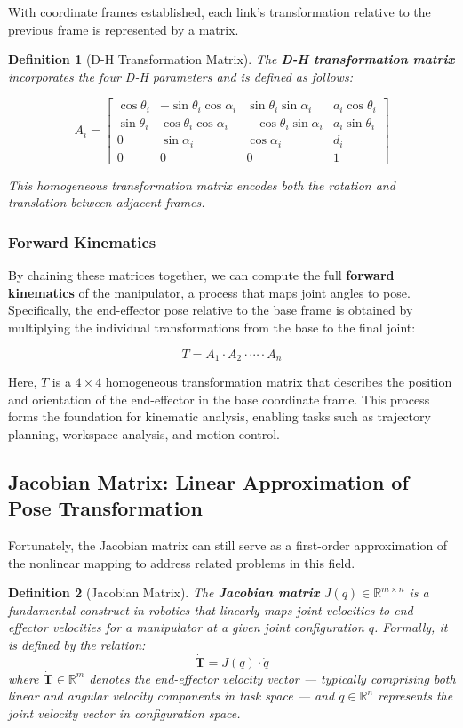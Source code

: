 \documentclass[conference]{IEEEtran}
\newtheorem{definition}{Definition}
\begin{document}
With coordinate frames established, each link’s transformation relative to the previous frame is represented by a matrix.

\begin{definition}[D-H Transformation Matrix]
	The \textbf{D-H transformation matrix} incorporates the four D-H parameters and is defined as follows:
	
	\[
	A_i=
	\begin{bmatrix}
		\cos\theta_i & -\sin\theta_i \cos\alpha_i & \sin\theta_i \sin\alpha_i & a_i \cos\theta_i \\
		\sin\theta_i & \cos\theta_i \cos\alpha_i & -\cos\theta_i \sin\alpha_i & a_i \sin\theta_i \\
		0 & \sin\alpha_i & \cos\alpha_i & d_i \\
		0 & 0 & 0 & 1
	\end{bmatrix}
	\]
	
	This homogeneous transformation matrix encodes both the rotation and translation between adjacent frames.
\end{definition}

\subsubsection{Forward Kinematics}
By chaining these matrices together, we can compute the full \textbf{forward kinematics} of the manipulator, a process that maps joint angles to pose. Specifically, the end-effector pose relative to the base frame is obtained by multiplying the individual transformations from the base to the final joint:

\[
T = A_1 \cdot A_2 \cdot \cdots \cdot A_n
\]

Here, \( T \) is a \( 4 \times 4 \) homogeneous transformation matrix that describes the position and orientation of the end-effector in the base coordinate frame. This process forms the foundation for kinematic analysis, enabling tasks such as trajectory planning, workspace analysis, and motion control.

\subsection{Jacobian Matrix: Linear Approximation of Pose Transformation}

Fortunately, the Jacobian matrix can still serve as a first-order approximation of the nonlinear mapping to address related problems in this field.

\begin{definition}[Jacobian Matrix]
	The \textbf{Jacobian matrix} $J(q) \in \mathbb{R}^{m \times n}$ is a fundamental construct in robotics that linearly maps joint velocities to end-effector velocities for a manipulator at a given joint configuration $q$. Formally, it is defined by the relation:
	\[
	\dot{\bm{T}} = J(q) \cdot \dot{q}
	\]
	where \(\dot{\bm{T}} \in \mathbb{R}^{m}\) denotes the end-effector velocity vector \emph{---} typically comprising both linear and angular velocity components in task space \emph{---} and \(\dot{q} \in \mathbb{R}^{n}\) represents the joint velocity vector in configuration space. 
\end{definition}
\end{document}
